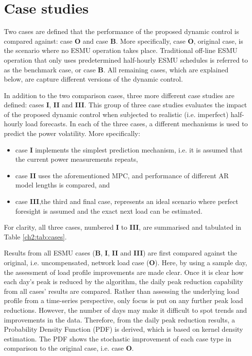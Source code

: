 \section{Case studies}
\label{ch2:sec:case-studies}

Two cases are defined that the performance of the proposed dynamic control is compared against: case \textbf{O} and case \textbf{B}.
More specifically, case \textbf{O}, original case, is the scenario where no ESMU operation takes place.
Traditional off-line ESMU operation that only uses predetermined half-hourly ESMU schedules is referred to as the benchmark case, or case \textbf{B}.
All remaining cases, which are explained below, are capture different versions of the dynamic control.

In addition to the two comparison cases, three more different case studies are defined: cases \textbf{I}, \textbf{II} and \textbf{III}.
This group of three case studies evaluates the impact of the proposed dynamic control when subjected to realistic (i.e. imperfect) half-hourly load forecasts.
In each of the three cases, a different mechanisms is used to predict the power volatility.
More specifically:
\begin{itemize}
	\item case \textbf{I} implements the simplest prediction mechanism, i.e. it is assumed that the current power measurements repeats,
	\item case \textbf{II} uses the aforementioned MPC, and performance of different AR model lengths is compared, and
	\item case \textbf{III},the third and final case, represents an ideal scenario where perfect foresight is assumed and the exact next load can be estimated.
\end{itemize}
For clarity, all three cases, numbered \textbf{I} to \textbf{III}, are summarised and tabulated in Table \ref{ch2:tab:cases}.



Results from all ESMU cases (\textbf{B}, \textbf{I}, \textbf{II} and \textbf{III}) are first compared against the original, i.e. uncompensated, network load case (\textbf{O}).
Here, by using a sample day, the assessment of load profile improvements are made clear.
Once it is clear how each day's peak is reduced by the algorithm, the daily peak reduction capability from all cases' results are compared.
Rather than assessing the underlying load profile from a time-series perspective, only focus is put on any further peak load reductions.
However, the number of days may make it difficult to spot trends and improvements in the data.
Therefore, from the daily peak reduction results, a Probability Density Function (PDF) is derived, which is based on kernel density estimation.
The PDF shows the stochastic improvement of each case type in comparison to the original case, i.e. case \textbf{O}.

